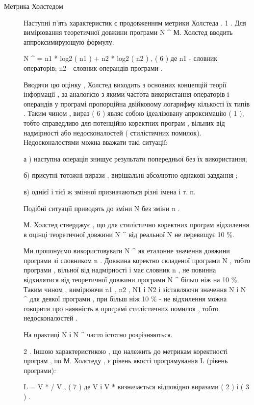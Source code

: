 \begin{description}
\item[{Метрика Холстедом}] \leavevmode
Наступні п'ять характеристик є продовженням метрики Холстеда .
1 . Для вимірювання теоретичної довжини програми N \textasciicircum{} М. Холстед вводить аппроксимирующую формулу:

N \textasciicircum{} = n1 * log2 ( n1 ) + n2 * log2 ( n2 ) , ( 6 )
де n1 - словник операторів; n2 - словник операндів програми .

Вводячи цю оцінку , Холстед виходить з основних концепцій теорії інформації , за аналогією з якими частота використання операторів і операндів у програмі пропорційна двійковому логарифму кількості їх типів . Таким чином , вираз ( 6 ) являє собою ідеалізовану апроксимацію ( 1 ), тобто справедливо для потенційно коректних програм , вільних від надмірності або недосконалостей ( стилістичних помилок). Недосконалостями можна вважати такі ситуації:

а ) наступна операція знищує результати попередньої без їх використання;

б) присутні тотожні вирази , вирішальні абсолютно однакові завдання ;

в) однієї і тієї ж змінної призначаються різні імена і т. п.

Подібні ситуації приводять до зміни N без зміни n .

М. Холстед стверджує , що для стилістично коректних програм відхилення в оцінці теоретичної довжини N \textasciicircum{} від реальної N не перевищує 10 \%.

Ми пропонуємо використовувати N \textasciicircum{} як еталонне значення довжини програми зі словником n . Довжина коректно складеної програми N , тобто програми , вільної від надмірності і має словник n , не повинна відхилятися від теоретичної довжини програми N \textasciicircum{} більш ніж на 10 \%. Таким чином , вимірюючи n1 , n2 , N1 і N2 і зіставляючи значення N і N \textasciicircum{} для деякої програми , при більш ніж 10 \% - не відхилення можна говорити про наявність в програмі стилістичних помилок , тобто недосконалостей .

На практиці N і N \textasciicircum{} часто істотно розрізняються.

2 . Іншою характеристикою , що належить до метрикам коректності програм , по М. Холстеду , є рівень якості програмування L (рівень програми):

L = V * / V , ( 7 )
де V і V * визначається відповідно виразами ( 2 ) і ( 3 ) .


\end{description}
